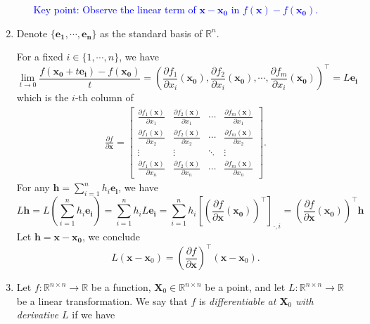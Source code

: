 \documentclass[11pt,letter,notitlepage]{article}
\theoremstyle{definition}
\begin{document}
\begin{solution}
\begin{enumerate}
\begin{enumerate}
		\textcolor{blue}{Key point: Observe the linear term of $\mathbf{x} - \mathbf{x_0}$ in $f(\mathbf{x}) - f(\mathbf{x_0})$.}
	\end{enumerate}
	\item
	Denote $\{\mathbf{e_1}, \cdots, \mathbf{e_n}\}$ as the standard basis of $\mathbb{R}^n$.

	For a fixed $i \in \{1, \cdots, n\}$, we have
	\[
	\lim\limits_{t \to 0} \frac{f(\mathbf{x_0} + t \mathbf{e_i}) - f(\mathbf{x_0})}{t} = \left(\frac{\partial f_1}{\partial x_i}(\mathbf{x_0}), \frac{\partial f_2}{\partial x_i}(\mathbf{x_0}), \cdots, \frac{\partial f_m}{\partial x_i}(\mathbf{x_0})\right)^{\top} = L \mathbf{e_i}
	\]
	which is the $i$-th column of
	\begin{align*}
                \frac{\partial f}{\partial \mathbf{x}} = \left[
                \begin{matrix}
                    \displaystyle \frac{\partial f_1 (\mathbf{x})}{\partial x_1} & \displaystyle\frac{\partial f_2 (\mathbf{x})}{\partial x_1} & \cdots & \displaystyle\frac{\partial f_m (\mathbf{x})}{\partial x_1} \\
                    \displaystyle\frac{\partial f_1 (\mathbf{x})}{\partial x_2} & \displaystyle\frac{\partial f_2 (\mathbf{x})}{\partial x_2} & \cdots & \displaystyle\frac{\partial f_m (\mathbf{x})}{\partial x_2} \\
                    \vdots & \vdots & \ddots & \vdots \\
                    \displaystyle \frac{\partial f_1 (\mathbf{x})}{\partial x_n} & \displaystyle\frac{\partial f_2 (\mathbf{x})}{\partial x_n} & \cdots & \displaystyle\frac{\partial f_m (\mathbf{x})}{\partial x_n}
                \end{matrix}\right].
            \end{align*}
	For any $\mathbf{h} = \sum\limits_{i=1}^{n}h_i \mathbf{e_i}$, we have
	\[
	L\mathbf{h}
	=
	L\left(\sum\limits_{i=1}^{n}h_i \mathbf{e_i}\right)
	=
	\sum\limits_{i=1}^{n}h_i L\mathbf{e_i}
	=
	\sum\limits_{i=1}^{n}h_i \left[\left(\frac{\partial f}{\partial \mathbf{x}}(\mathbf{x_0})\right)^{\top}\right]_{\cdot, i}
	=
	\left(\frac{\partial f}{\partial \mathbf{x}}(\mathbf{x_0})\right)^{\top}\mathbf{h}
	\]
	Let $\mathbf{h} = \mathbf{x} - \mathbf{x_0}$, we conclude
	\[
	L(\mathbf{x} - \mathbf{x}_0) = \left( \frac{\partial f}{\partial \mathbf{x}} \right)^\top (\mathbf{x} - \mathbf{x}_0).
	\]
	\item
	Let $f:\mathbb{R}^{n\times n}\rightarrow\mathbb{R}$ be a function, $\mathbf{X}_0\in\mathbb{R}^{n\times n}$ be a point, and let $L:\mathbb{R}^{n\times n}\rightarrow\mathbb{R}$ be a linear transformation. We say that $f$ is \emph{differentiable at $\mathbf{X}_0$ with derivative $L$} if we have

\end{enumerate}
\end{solution}
\end{document}
